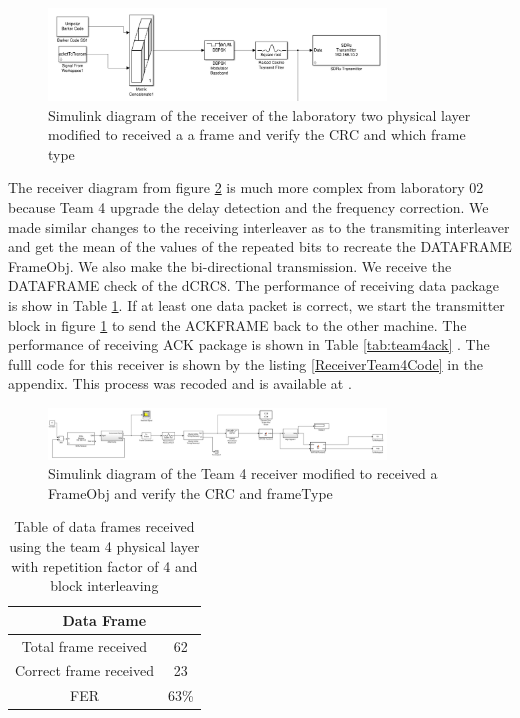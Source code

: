 \begin{figure}[ht]
    \centering
    \includegraphics[width=0.8\textwidth]{transmitter_team4.PNG}
    \caption{Simulink diagram of the receiver of the laboratory two physical layer modified to received a a frame and verify the CRC and which frame type }
    \label{fig:transmitter_team4}
\end{figure}

The receiver diagram from figure \ref{fig:receiver_team4} is much more complex from laboratory 02 because Team 4 upgrade the delay detection and the frequency correction.
We made similar changes to the receiving interleaver as to the transmiting interleaver and get the mean of the values of the repeated bits to recreate the DATAFRAME FrameObj.
We also make the bi-directional transmission. We receive the DATAFRAME check of the dCRC8. The performance of receiving data package is show in Table \ref{tab:team4data}. If at least one data packet is correct, we start the transmitter block in figure \ref{fig:transmitter_team4} to send the ACKFRAME back to the other machine. The performance of receiving ACK package is shown in Table \ref{tab:team4ack} . The fulll code for this receiver is shown by the listing \ref{ReceiverTeam4Code} in the appendix. This process was recoded and is available at \cite{videodemo}. 
 

\begin{figure}[ht]
    \centering
    \includegraphics[width=0.8\textwidth]{receiver_team4.PNG}
    \caption{Simulink diagram of the Team 4 receiver modified to received a FrameObj and verify the CRC and frameType }
    \label{fig:receiver_team4}
\end{figure}

\begin{table}[ht]
	\centering
		\begin{tabular}{| c | c | }
		\hline
			\multicolumn{2}{|c|}{Data Frame}\\
		\hline                       
			 Total frame received & 62\\
			 Correct frame received& 23\\
		\hline
			FER & 63\%\\
		\hline
		\end{tabular}
	\caption{Table of data frames received using the team 4 physical layer with repetition factor of 4 and block interleaving}
	\label{tab:team4data}
	\end{table}

